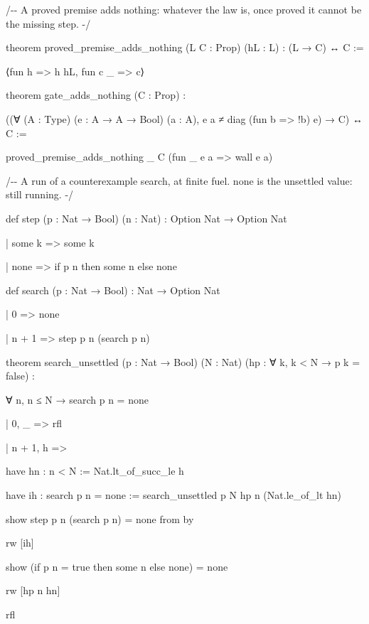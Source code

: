\documentclass[10pt,twocolumn]{article}
\newenvironment{Shaded}{}{}
\newcommand{\NormalTok}[1]{#1}
\providecommand{\NormalTok}[1]{#1}
\providecommand{\NormalTok}[1]{#1}
\begin{document}
\begin{strip}
\begin{Shaded}
\begin{Highlighting}[]
\NormalTok{/{-}{-} A proved premise adds nothing: whatever the law is, once proved it cannot be the missing step. {-}/}

\NormalTok{theorem proved\_premise\_adds\_nothing (L C : Prop) (hL : L) : (L → C) ↔ C :=}

\NormalTok{  ⟨fun h =\textgreater{} h hL, fun c \_ =\textgreater{} c⟩}

\NormalTok{theorem gate\_adds\_nothing (C : Prop) :}

\NormalTok{    ((∀ (A : Type) (e : A → A → Bool) (a : A), e a ≠ diag (fun b =\textgreater{} !b) e) → C) ↔ C :=}

\NormalTok{  proved\_premise\_adds\_nothing \_ C (fun \_ e a =\textgreater{} wall e a)}

\NormalTok{/{-}{-} A run of a counterexample search, at finite fuel. \textasciigrave{}none\textasciigrave{} is the unsettled value: still running. {-}/}

\NormalTok{def step (p : Nat → Bool) (n : Nat) : Option Nat → Option Nat}

\NormalTok{  | some k =\textgreater{} some k}

\NormalTok{  | none =\textgreater{} if p n then some n else none}

\NormalTok{def search (p : Nat → Bool) : Nat → Option Nat}

\NormalTok{  | 0 =\textgreater{} none}

\NormalTok{  | n + 1 =\textgreater{} step p n (search p n)}

\NormalTok{theorem search\_unsettled (p : Nat → Bool) (N : Nat) (hp : ∀ k, k \textless{} N → p k = false) :}

\NormalTok{    ∀ n, n ≤ N → search p n = none}

\NormalTok{  | 0, \_ =\textgreater{} rfl}

\NormalTok{  | n + 1, h =\textgreater{}}

\NormalTok{    have hn : n \textless{} N := Nat.lt\_of\_succ\_le h}

\NormalTok{    have ih : search p n = none := search\_unsettled p N hp n (Nat.le\_of\_lt hn)}

\NormalTok{    show step p n (search p n) = none from by}

\NormalTok{      rw [ih]}

\NormalTok{      show (if p n = true then some n else none) = none}

\NormalTok{      rw [hp n hn]}

\NormalTok{      rfl}


\end{Highlighting}
\end{Shaded}
\end{strip}
\end{document}
